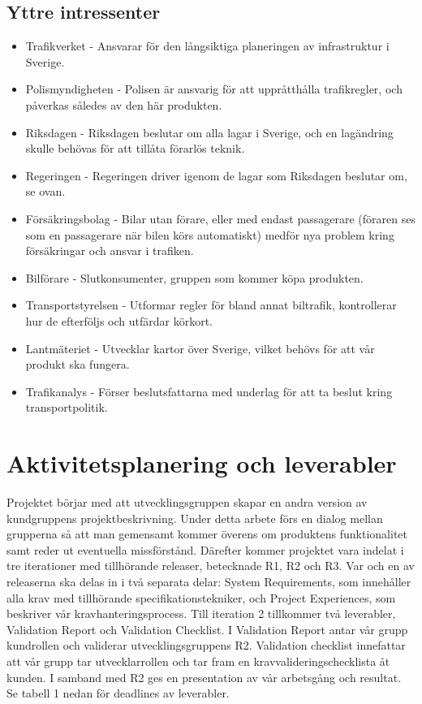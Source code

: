 \documentclass[10pt]{article}
\begin{document}
\subsection{Yttre intressenter}
\noindent
\begin{itemize}
	\setlength\itemsep{0.1em}
	\item Trafikverket - Ansvarar för den långsiktiga planeringen av infrastruktur i Sverige.
	\item Polismyndigheten - Polisen är ansvarig för att uppråtthålla trafikregler, och påverkas således av den här produkten.
	\item Riksdagen - Riksdagen beslutar om alla lagar i Sverige, och en lagändring skulle behövas för att tillåta förarlös teknik.
	\item Regeringen - Regeringen driver igenom de lagar som Riksdagen beslutar om, se ovan.
	\item Försäkringsbolag - Bilar utan förare, eller med endast passagerare (föraren ses som en passagerare när bilen körs automatiskt) medför nya problem kring försäkringar och ansvar i trafiken.
	\item Bilförare - Slutkonsumenter, gruppen som kommer köpa produkten.
	\item Transportstyrelsen - Utformar regler för bland annat biltrafik, kontrollerar hur de efterföljs och utfärdar körkort.
	\item Lantmäteriet - Utvecklar kartor över Sverige, vilket behövs för att vår produkt ska fungera.
	\item Trafikanalys - Förser beslutsfattarna med underlag för att ta beslut kring transportpolitik.
\end{itemize}

\section{Aktivitetsplanering och leverabler}
\sloppy
\noindent
Projektet börjar med att utvecklingsgruppen skapar en andra version av kundgruppens projektbeskrivning. Under detta arbete förs en dialog mellan grupperna så att man gemensamt kommer överens om produktens funktionalitet samt reder ut eventuella missförstånd.  
Därefter kommer projektet vara indelat i tre iterationer med tillhörande releaser, betecknade R1, R2 och R3. Var och en av releaserna ska delas in i två separata delar: System Requirements, som innehåller alla krav med tillhörande specifikationstekniker, och Project Experiences, som beskriver vår kravhanteringsprocess. Till iteration 2 tillkommer två leverabler, Validation Report och Validation Checklist. I Validation Report antar vår grupp kundrollen och validerar utvecklingsgruppens R2. Validation checklist innefattar att vår grupp tar utvecklarrollen och tar fram en kravvalideringschecklista åt kunden. I samband med R2 ges en presentation av vår arbetsgång och resultat. Se tabell 1 nedan för deadlines av leverabler.  
\\
\\
\end{document}
